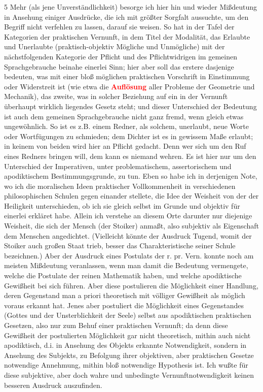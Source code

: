 \documentclass[a4paper,12pt,twoside]{book}
\newcommand{\match}[1]{\textcolor{red}{\textbf{#1}}}
\begin{document}
	5 Mehr (als jene Unverständlichkeit) besorge ich hier hin und wieder Mißdeutung in Ansehung einiger Ausdrücke, die ich mit größter Sorgfalt aussuchte, um den Begriff nicht verfehlen zu lassen, darauf sie weisen. So hat in der Tafel der Kategorien der praktischen Vernunft, in dem Titel der Modalität, das Erlaubte und Unerlaubte (praktisch-objektiv Mögliche und Unmögliche) mit der nächstfolgenden Kategorie der Pflicht und des Pflichtwidrigen im gemeinen Sprachgebrauche beinahe einerlei Sinn; hier aber soll das erstere dasjenige bedeuten, was mit einer bloß möglichen praktischen Vorschrift in Einstimmung oder Widerstreit ist (wie etwa die \match{Auflösung} aller Probleme der Geometrie und Mechanik), das zweite, was in solcher Beziehung auf ein in der Vernunft überhaupt wirklich liegendes Gesetz steht; und dieser Unterschied der Bedeutung ist auch dem gemeinen Sprachgebrauche nicht ganz fremd, wenn gleich etwas ungewöhnlich. So ist es z.B. einem Redner, als solchem, unerlaubt, neue Worte oder Wortfügungen zu schmieden; dem Dichter ist es in gewissem Maße erlaubt; in keinem von beiden wird hier an Pflicht gedacht. Denn wer sich um den Ruf eines Redners bringen will, dem kann es niemand wehren. Es ist hier nur um den Unterschied der Imperativen, unter problematischem, assertorischem und apodiktischem Bestimmungsgrunde, zu tun. Eben so habe ich in derjenigen Note, wo ich die moralischen Ideen praktischer Vollkommenheit in verschiedenen philosophischen Schulen gegen einander stellete, die Idee der Weisheit von der der Heiligkeit unterschieden, ob ich sie gleich selbst im Grunde und objektiv für einerlei erkläret habe. Allein ich verstehe an diesem Orte darunter nur diejenige Weisheit, die sich der Mensch (der Stoiker) anmaßt, also subjektiv als Eigenschaft dem Menschen angedichtet. (Vielleicht könnte der Ausdruck Tugend, womit der Stoiker auch großen Staat trieb, besser das Charakteristische seiner Schule bezeichnen.) Aber der Ausdruck eines Postulats der r. pr. Vern. konnte noch am meisten Mißdeutung veranlassen, wenn man damit die Bedeutung vermengete, welche die Postulate der reinen Mathematik haben, und welche apodiktische Gewißheit bei sich führen. Aber diese postulieren die Möglichkeit einer Handlung, deren Gegenstand man a priori theoretisch mit völliger Gewißheit als möglich voraus erkannt hat. Jenes aber postuliert die Möglichkeit eines Gegenstandes (Gottes und der Unsterblichkeit der Seele) selbst aus apodiktischen praktischen Gesetzen, also nur zum Behuf einer praktischen Vernunft; da denn diese Gewißheit der postulierten Möglichkeit gar nicht theoretisch, mithin auch nicht apodiktisch, d.i. in Ansehung des Objekts erkannte Notwendigkeit, sondern in Ansehung des Subjekts, zu Befolgung ihrer objektiven, aber praktischen Gesetze notwendige Annehmung, mithin bloß notwendige Hypothesis ist. Ich wußte für diese subjektive, aber doch wahre und unbedingte Vernunftnotwendigkeit keinen besseren Ausdruck auszufinden. 
	
\end{document}
